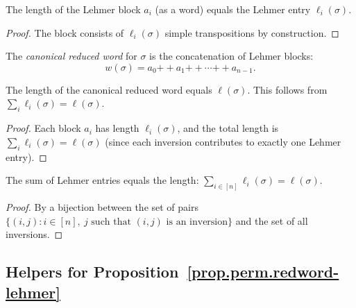 \begin{lemma}
\label{lem.perm.lehmerBlock_length}
\leanhelper
\leanok
The length of the Lehmer block $a_i$ (as a word) equals the Lehmer entry $\ell_i(\sigma)$.
\end{lemma}

\begin{proof}
\leanok
The block consists of $\ell_i(\sigma)$ simple transpositions by construction.
\end{proof}

\begin{definition}
\label{def.perm.canonicalReducedWord}
\leanhelper
\leanok
The \emph{canonical reduced word} for $\sigma$ is the concatenation
of Lehmer blocks:
\[
w(\sigma) = a_0 \mathbin{+\!+} a_1 \mathbin{+\!+} \cdots \mathbin{+\!+} a_{n-1}.
\]
\end{definition}

\begin{lemma}
\label{lem.perm.canonicalReducedWord-length}
\leanhelper
\leanok
The length of the canonical reduced word equals $\ell(\sigma)$.
This follows from $\sum_{i} \ell_i(\sigma) = \ell(\sigma)$.
\end{lemma}

\begin{proof}
\leanok
Each block $a_i$ has length $\ell_i(\sigma)$, and the total length is
$\sum_i \ell_i(\sigma) = \ell(\sigma)$ (since each inversion contributes
to exactly one Lehmer entry).
\end{proof}

\begin{lemma}
\label{lem.perm.sum-lehmer-eq-length}
\leanhelper
\leanok
The sum of Lehmer entries equals the length:
$\sum_{i \in [n]} \ell_i(\sigma) = \ell(\sigma)$.
\end{lemma}

\begin{proof}
\leanok
By a bijection between the set of pairs $\{(i, j) : i \in [n],\ j \text{ such that } (i,j) \text{ is an inversion}\}$
and the set of all inversions.
\end{proof}

\subsection{Helpers for Proposition~\ref{prop.perm.redword-lehmer}}


